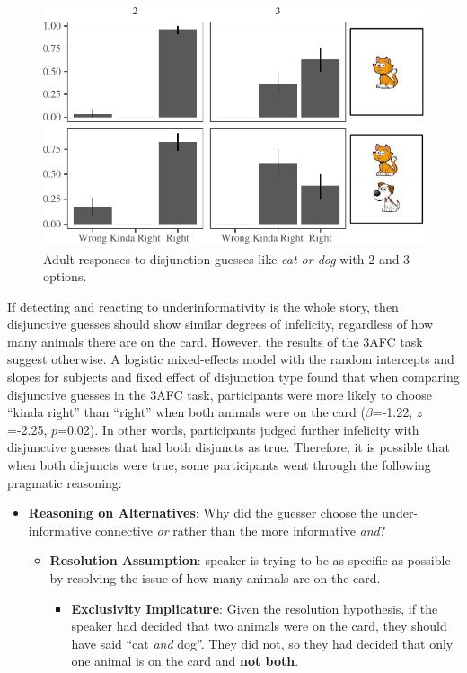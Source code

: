 \documentclass[man]{apa6}
\providecommand{\tightlist}{%
  \setlength{\itemsep}{0pt}\setlength{\parskip}{0pt}}
\theoremstyle{definition}
\theoremstyle{definition}
\theoremstyle{definition}
\theoremstyle{remark}
\begin{document}
\begin{figure}[tb]

{\centering \includegraphics{figs/implicaturePlot-1} 

}

\caption{Adult responses to disjunction guesses like \textit{cat or dog} with 2 and 3 options.}\label{fig:implicaturePlot}
\end{figure}

If detecting and reacting to underinformativity is the whole story, then
disjunctive guesses should show similar degrees of infelicity,
regardless of how many animals there are on the card. However, the
results of the 3AFC task suggest otherwise. A logistic mixed-effects
model with the random intercepts and slopes for subjects and fixed
effect of disjunction type found that when comparing disjunctive guesses
in the 3AFC task, participants were more likely to choose \enquote{kinda
right} than \enquote{right} when both animals were on the card
(\(\beta\)=-1.22, \(z\)=-2.25, \(p\)=0.02). In other words, participants
judged further infelicity with disjunctive guesses that had both
disjuncts as true. Therefore, it is possible that when both disjuncts
were true, some participants went through the following pragmatic
reasoning:

\begin{itemize}
\tightlist
\item
  \textbf{Reasoning on Alternatives}: Why did the guesser choose the
  under-informative connective \emph{or} rather than the more
  informative \emph{and}?

  \begin{itemize}
  \tightlist
  \item
    \textbf{Resolution Assumption}: speaker is trying to be as specific
    as possible by resolving the issue of how many animals are on the
    card.

    \begin{itemize}
    \tightlist
    \item
      \textbf{Exclusivity Implicature}: Given the resolution hypothesis,
      if the speaker had decided that two animals were on the card, they
      should have said \enquote{cat \emph{and} dog}. They did not, so
      they had decided that only one animal is on the card and
      \textbf{not both}.
    \end{itemize}
  \end{itemize}
\end{itemize}
\end{document}
